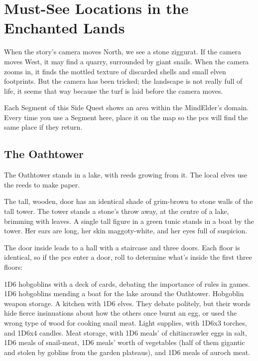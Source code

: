 \section{Must-See Locations in the Enchanted Lands}

When the story's camera moves North, we see a stone ziggurat.
If the camera moves West, it may find a quarry, surrounded by giant snails.
When the camera zooms in, it finds the mottled texture of discarded shells and small elven footprints.
But the camera has been tricked; the landscape is not really full of life, it seems that way because the turf is laid before the camera moves.

Each Segment of this Side Quest shows an area within the MindElder's domain.
Every time you use a Segment here, place it on the map so the \glspl{pc} will find the same place if they return.

\subsection{The Oathtower}

The Oathtower stands in a lake, with reeds growing from it.
The local elves use the reeds to make paper.

\begin{boxtext}
  The tall, wooden, door has an identical shade of grim-brown to stone walls of the tall tower.
  The tower stands a stone's throw away, at the centre of a lake, brimming with leaves.
  A single tall figure in a green tunic stands in a boat by the tower.
  Her ears are long, her skin maggoty-white, and her eyes full of suspicion.
\end{boxtext}

The door inside leads to a hall with a staircase and three doors.
Each floor is identical, so if the \glspl{pc} enter a door, roll to determine what's inside the first three floors:

\begin{dlist}
  1D6 hobgoblins with a deck of cards, debating the importance of rules in games.
  1D6 hobgoblins mending a boat for the lake around the Oathtower.
  Hobgoblin weapon storage.
  A kitchen with 1D6 elves.  They debate politely, but their words hide fierce insinuations about how the others once burnt an egg, or used the wrong type of wood for cooking snail meat.
  Light supplies, with 1D6x3 torches, and 1D6x4 candles.
  Meat storage, with 1D6 meals' of \gls{chitincrawler} eggs in salt, 1D6 meals of snail-meat, 1D6 meals' worth of vegetables (half of them gigantic and stolen by goblins from the garden plateaus), and 1D6 meals of auroch meat.
\end{dlist}

